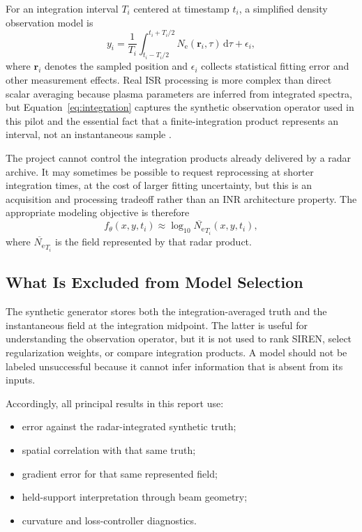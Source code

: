 \documentclass[11pt]{article}
\newcommand{\Ne}{N_{\mathrm e}}
\begin{document}
For an integration interval $T_i$ centered at timestamp $t_i$, a simplified density observation model is
\begin{equation}
  y_i = \frac{1}{T_i}\int_{t_i-T_i/2}^{t_i+T_i/2}
  \Ne(\mathbf r_i,\tau)\,\mathrm d\tau + \epsilon_i,
  \label{eq:integration}
\end{equation}
where $\mathbf r_i$ denotes the sampled position and $\epsilon_i$ collects statistical fitting error and
other measurement effects. Real ISR processing is more complex than direct scalar averaging because plasma
parameters are inferred from integrated spectra, but Equation~\eqref{eq:integration} captures the synthetic
observation operator used in this pilot and the essential fact that a finite-integration product represents
an interval, not an instantaneous sample \cite{LehtinenHuuskonen1996,Virtanen2008,Diaz2026ISRError}.

The project cannot control the integration products already delivered by a radar archive. It may sometimes
be possible to request reprocessing at shorter integration times, at the cost of larger fitting uncertainty,
but this is an acquisition and processing tradeoff rather than an INR architecture property. The appropriate
modeling objective is therefore
\begin{equation}
  f_{\theta}(x,y,t_i) \approx \log_{10}\overline{\Ne}_{T_i}(x,y,t_i),
\end{equation}
where $\overline{\Ne}_{T_i}$ is the field represented by that radar product.

\subsection{What Is Excluded from Model Selection}

The synthetic generator stores both the integration-averaged truth and the instantaneous field at the
integration midpoint. The latter is useful for understanding the observation operator, but it is not used
to rank SIREN, select regularization weights, or compare integration products. A model should not be labeled
unsuccessful because it cannot infer information that is absent from its inputs.

Accordingly, all principal results in this report use:
\begin{itemize}
  \item error against the radar-integrated synthetic truth;
  \item spatial correlation with that same truth;
  \item gradient error for that same represented field;
  \item held-support interpretation through beam geometry;
  \item curvature and loss-controller diagnostics.
\end{itemize}
\end{document}
